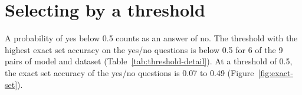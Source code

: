 \section{Selecting by a threshold}
\label{app:thresholds}
A probability of yes below 0.5 counts as an answer of no. The threshold with the highest exact set accuracy on the yes/no questions is below 0.5 for 6 of the 9 pairs of model and dataset (Table~\ref{tab:threshold-detail}). At a threshold of 0.5, the exact set accuracy of the yes/no questions is 0.07 to 0.49 (Figure~\ref{fig:exact-set}).

\begin{table}[H]
\caption{The threshold with the highest exact set accuracy on the examples of Table~\ref{tab:thresholds} (\emph{Threshold}), the share of lists with every correct choice above every distractor (\emph{Ranked}), and the share of those lists whose set is exact at that threshold (\emph{Exact among ranked}), precision and recall at that threshold, and the highest F1 over all thresholds, with its threshold in parentheses (\emph{Best F1}). Precision, recall and F1 pool the choices of all lists. \emph{List} uses the probabilities of every permutation of the list in Table~\ref{tab:allocation}, and \emph{Yes/no} the probability of yes of each choice, one list per example. The highest and the lowest value of each setting in the columns Threshold and Exact among ranked are in bold.}
\label{tab:threshold-detail}
\centering
\resizebox{\linewidth}{!}{}
\end{table}
